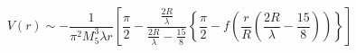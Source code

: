 \begin{equation}
\label{rev9}
V(r) \sim -\frac{1}{\pi^2 M_5^3 \lambda r}
\left[ \frac{\pi}{2} - 
\frac{\frac{2R}{\lambda}}{\frac{2R}{\lambda} - \frac{15}{8}}
\left\{\frac{\pi}{2} - f\left(\frac{r}{R} \left(\frac{2R}{\lambda} - 
\frac{15}{8} \right) \right) \right\} \right]
\end{equation}

